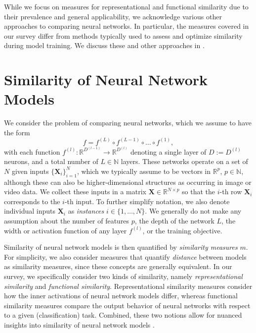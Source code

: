 \documentclass{article}
\newcommand{\Nat}{\mathbb{N}}
\newcommand{\Real}{\mathbb{R}}
\begin{document}
While we focus on measures for representational and functional similarity due to their prevalence and general applicability, we acknowledge various other approaches to comparing neural networks.
In particular, the measures covered in our survey differ from methods typically used to assess and optimize similarity during model training. We discuss these and other approaches in .



\section{Similarity of Neural Network Models}\label{sec:modelsim}
We consider the problem of comparing  neural networks, which we assume to have the form
\begin{equation}
f = f^{(L)} \circ f^{(L-1)} \circ \dots \circ f^{(1)},
\end{equation}
with each function $f^{(l)}:\Real^{D^{(l-1)}} \longrightarrow \Real^{D^{(l)}}$ denoting a single layer of $D:=D^{(l)}$ neurons, and a total number of $L\in\Nat$ layers.
These networks operate on a set of $N$ given inputs $\{\bm{X}_i\}_{i=1}^N$,
which we typically assume to be vectors in $\Real^p$, $p\in\mathbb{N}$, although these can also be higher-dimensional structures as occurring in image or video data.
We collect these inputs in a matrix $\bm{X}\in\Real^{N\times p}$ so that the $i$-th row $\bm{X}_i$ corresponds to the $i$-th input.
To further simplify notation, we also denote individual inputs $\bm{X}_i$ as \emph{instances} $i\in\{1,\dots,N\}$.
We generally do not make any assumption about the number of features $p$, the depth of the network $L$, the width or activation function of any layer $f^{(l)}$, or the training objective.

Similarity of neural network models is then quantified by \emph{similarity measures} $m$.
For simplicity, we also consider measures that quantify \emph{distance} between models as similarity measures, since these concepts are generally equivalent.
In our survey, we specifically consider two kinds of similarity, namely \emph{representational similarity} and \emph{functional similarity}.
Representational similarity measures consider how the inner activations of neural network models differ, whereas functional similarity measures compare the output behavior of neural networks with respect to a given (classification) task.
Combined, these two notions allow for nuanced insights into similarity of neural network models \cite{summers_nondeterminism_2021,klabunde_prediction_2023,gwilliam_beyond_2022}.
\end{document}
